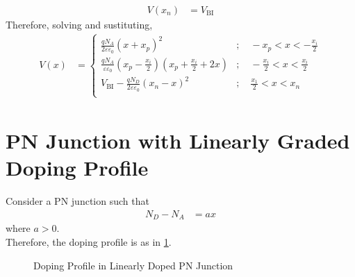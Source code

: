 \documentclass[titlepage, fleqn, a4paper, 12pt, twoside]{article}
\theoremstyle{definition}
\theoremstyle{theorem}
\begin{document}
\begin{solution}
\begin{enumerate}[leftmargin=*]
\begin{align*}
				V(x_n) & = V_{\text{BI}}
			\end{align*}
			Therefore, solving and sustituting,
			\begin{align*}
				V(x) &=
					\begin{cases}
						\frac{q N_A}{2 \varepsilon \varepsilon_0} (x + x_p)^2                                                               & ;\quad -x_p < x < -\frac{x_i}{2}          \\
						\frac{q N_A}{\varepsilon \varepsilon_0} \left( x_p - \frac{x_i}{2} \right) \left( x_p + \frac{x_i}{2} + 2 x \right) & ;\quad -\frac{x_i}{2} < x < \frac{x_i}{2} \\
						V_{\text{BI}} - \frac{q N_D}{2 \varepsilon \varepsilon_0} (x_n - x)^2                                               & ;\quad \frac{x_1}{2} < x < x_n            \\
					\end{cases}
			\end{align*}
	\end{enumerate}
\end{solution}

\section{PN Junction with Linearly Graded Doping Profile}

Consider a PN junction such that
\begin{align*}
	N_D - N_A & = a x
\end{align*}
where $a > 0$.\\
Therefore, the doping profile is as in \cref{fig:Doping_Profile_in_Linearly_Doped_PN_Junction}.
\begin{figure}[h]
	\centering
	\caption{Doping Profile in Linearly Doped PN Junction}
	\label{fig:Doping_Profile_in_Linearly_Doped_PN_Junction}
\end{figure}
\end{document}
